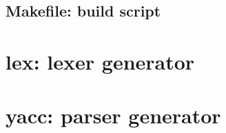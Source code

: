 \subsection{Makefile: build script}

\section{lex: lexer generator}

\section{yacc: parser generator}
